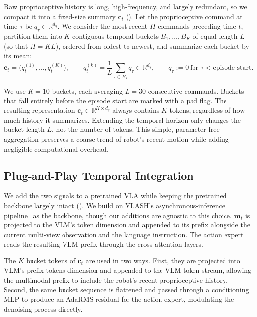 Raw proprioceptive history is long, high-frequency, and largely redundant, so we compact it into a fixed-size summary $\mathbf{c}_t$ (\TEMPOACT). Let the proprioceptive command at time $\tau$ be $q_\tau\in\mathbb{R}^{d_q}$. We consider the most recent $H$ commands preceding time $t$, partition them into $K$ contiguous temporal buckets $B_1,\ldots,B_K$ of equal length $L$ (so that $H=KL$), ordered from oldest to newest, and summarize each bucket by its mean:
\begin{equation}
\label{eq:joint-compaction}
\mathbf{c}_t=\bigl(\bar q^{(1)}_t,\dots,\bar q^{(K)}_t\bigr),\qquad
\bar q^{(k)}_t=\frac{1}{L}\sum_{\tau\in B_k} q_\tau\in\mathbb{R}^{d_q},\qquad
q_\tau:=0\ \text{for }\tau<\text{episode start}.
\end{equation}

We use $K=10$ buckets, each averaging $L=30$ consecutive commands. Buckets that fall entirely before the episode start are marked with a pad flag. The resulting representation $\mathbf{c}_t\in\mathbb{R}^{K\times d_q}$ always contains $K$ tokens, regardless of how much history it summarizes. Extending the temporal horizon only changes the bucket length $L$, not the number of tokens. This simple, parameter-free aggregation preserves a coarse trend of robot's recent motion while adding negligible computational overhead.

\vspace{-0.3em}
\subsection{Plug-and-Play Temporal Integration}
We add the two signals to a pretrained VLA while keeping the pretrained backbone largely intact (). We build on VLASH's asynchronous-inference pipeline~\cite{vlash} as the backbone, though our additions are agnostic to this choice. $\mathbf{m}_t$ is projected to the VLM's token dimension and appended to its prefix alongside the current multi-view observation and the language instruction. The action expert reads the resulting VLM prefix through the cross-attention layers. 

The $K$ bucket tokens of $\mathbf{c}_t$ are used in two ways. First, they are projected into VLM's prefix tokens dimension and appended to the VLM token stream, allowing the multimodal prefix to include the robot's recent proprioceptive history. Second, the same bucket sequence is flattened and passed through a conditioning MLP to produce an AdaRMS residual for the action expert, modulating the denoising process directly. 

